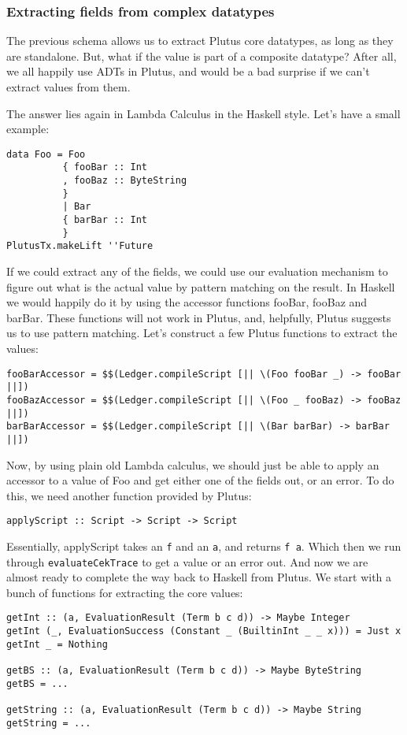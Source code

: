 \documentclass{article}
\begin{document}
\subsubsection{Extracting fields from complex datatypes}
The previous schema allows us to extract Plutus core datatypes, as long as they are standalone. But, what if the value is part of a composite datatype? After all, we all happily use ADTs in Plutus, and would be a bad surprise if we can't extract values from them.

The answer lies again in Lambda Calculus in the Haskell style. Let's have a small example:
\nopagebreak
\begin{verbatim}
data Foo = Foo
          { fooBar :: Int
          , fooBaz :: ByteString
          }
          | Bar
          { barBar :: Int
          }
PlutusTx.makeLift ''Future
\end{verbatim}
If we could extract any of the fields, we could use our evaluation mechanism to figure out what is the actual value by pattern matching on the result. In Haskell we would happily do it by using the accessor functions fooBar, fooBaz and barBar. These functions will not work in Plutus, and, helpfully, Plutus suggests us to use pattern matching. Let's construct a few Plutus functions to extract the values:
\nopagebreak
\begin{verbatim}
fooBarAccessor = $$(Ledger.compileScript [|| \(Foo fooBar _) -> fooBar ||]) 
fooBazAccessor = $$(Ledger.compileScript [|| \(Foo _ fooBaz) -> fooBaz ||]) 
barBarAccessor = $$(Ledger.compileScript [|| \(Bar barBar) -> barBar ||])
\end{verbatim}

Now, by using plain old Lambda calculus, we should just be able to apply an accessor to a value of Foo and get either one of the fields out, or an error. To do this, we need another function provided by Plutus:
\nopagebreak

\begin{verbatim}
applyScript :: Script -> Script -> Script
\end{verbatim}

Essentially, applyScript takes an \verb|f| and an \verb|a|, and returns \verb|f a|. Which then we run through \verb|evaluateCekTrace| to get a value or an error out. And now we are almost ready to complete the way back to Haskell from Plutus. We start with a bunch of functions for extracting the core values:
\nopagebreak

\begin{verbatim}
getInt :: (a, EvaluationResult (Term b c d)) -> Maybe Integer
getInt (_, EvaluationSuccess (Constant _ (BuiltinInt _ _ x))) = Just x
getInt _ = Nothing

getBS :: (a, EvaluationResult (Term b c d)) -> Maybe ByteString
getBS = ...

getString :: (a, EvaluationResult (Term b c d)) -> Maybe String
getString = ...
\end{verbatim}
\end{document}

